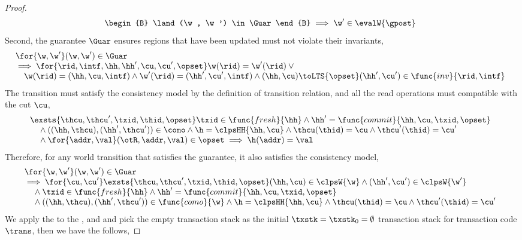 \begin{proof}
\[\begin{array}{@{}l}
\begin{B}
        \land (\w, \w') \in \Guar 
    \end{B}
    \implies \w' \in \evalW{\gpost}
\end{array}
\]
Second, the guarantee \( \Guar \) ensures regions that have been updated must not violate their invariants,
\[
\begin{array}{@{}l}
\for{\w,\w'} (\w,\w') \in \Guar  \\
\implies 
\for{\rid, \intf, \hh, \hh', \cu, \cu', \opset} \w(\rid) = \w'(\rid) \lor {} \\
\quad \w(\rid) = (\hh, \cu, \intf)
\land \w'(\rid) = (\hh', \cu', \intf)
\land (\hh, \cu) \toLTS{\opset} (\hh', \cu') \in \func{inv}{\rid, \intf}
\end{array}
\]
The transition must satisfy the consistency model by the definition of transition relation, and all the read operations must compatible with the cut \( \cu \),
\[
\begin{array}{@{}l}
    \exsts{ \thcu, \thcu', \txid, \thid, \opset }
    \txid \in \func{fresh}{\hh} 
    \land \hh' = \func{commit}{\hh, \cu, \txid, \opset} \\
    \quad {} \land ((\hh,\thcu),(\hh',\thcu')) \in \como
    \land \h = \clpsHH{\hh,\cu} 
    \land \thcu(\thid) = \cu 
    \land \thcu'(\thid) = \cu' \\
    \quad {} \land \for{\addr,\val} (\otR, \addr, \val)  \in \opset \implies \h(\addr) = \val
\end{array}
\]
Therefore, for any world transition that satisfies the guarantee, it also satisfies the consistency model,
\begin{equation}
\label{equ:transition-sat-consitency-model}
\begin{array}{@{}l}
    \for{\w, \w'} (\w, \w') \in \Guar \\
    \implies 
    \for{ \cu, \cu'}
    \exsts{ \thcu, \thcu', \txid, \thid, \opset }
    (\hh, \cu) \in \clpsW{\w}
    \land (\hh', \cu') \in \clpsW{\w'} \\
    \quad {} \land \txid \in \func{fresh}{\hh} 
    \land \hh' = \func{commit}{\hh, \cu, \txid, \opset} \\
    \quad {} \land ((\hh,\thcu),(\hh',\thcu')) \in \func{como}{\w}
    \land \h = \clpsHH{\hh,\cu} 
    \land \thcu(\thid) = \cu 
    \land \thcu'(\thid) = \cu' \\
\end{array}
\end{equation}
We apply the  to the ,  and  and pick the empty transaction stack as the initial \( \txstk = \txstk_{0} = \emptyset \) transaction stack for transaction code \( \trans \), then we have the follows,

\end{proof}
